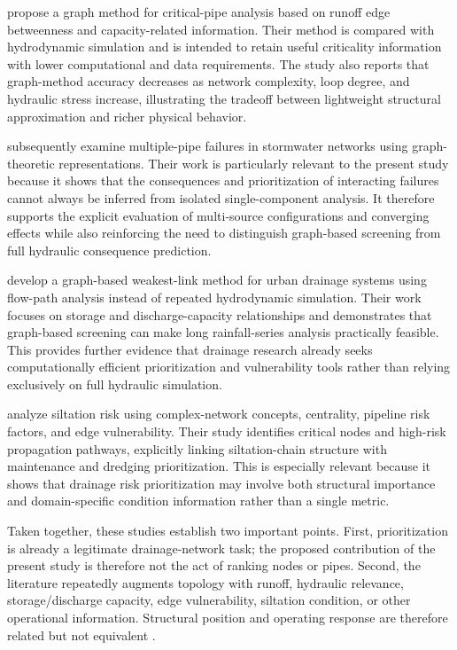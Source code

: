 \citet{dastgir2023} propose a graph method for critical-pipe
analysis based on runoff edge betweenness and capacity-related
information. Their method is compared with hydrodynamic simulation and
is intended to retain useful criticality information with lower
computational and data requirements. The study also reports that
graph-method accuracy decreases as network complexity, loop degree, and
hydraulic stress increase, illustrating the tradeoff between lightweight
structural approximation and richer physical behavior.

\citet{dastgir2024} subsequently examine multiple-pipe failures in
stormwater networks using graph-theoretic representations. Their work is
particularly relevant to the present study because it shows that the
consequences and prioritization of interacting failures cannot always be
inferred from isolated single-component analysis. It therefore supports
the explicit evaluation of multi-source configurations and converging
effects while also reinforcing the need to distinguish graph-based
screening from full hydraulic consequence prediction.

\citet{meijer2023} develop a graph-based weakest-link method for
urban drainage systems using flow-path analysis instead of repeated
hydrodynamic simulation. Their work focuses on storage and
discharge-capacity relationships and demonstrates that graph-based
screening can make long rainfall-series analysis practically feasible.
This provides further evidence that drainage research already seeks
computationally efficient prioritization and vulnerability tools rather
than relying exclusively on full hydraulic simulation.

\citet{zhang2025} analyze siltation risk using complex-network
concepts, centrality, pipeline risk factors, and edge vulnerability.
Their study identifies critical nodes and high-risk propagation
pathways, explicitly linking siltation-chain structure with maintenance
and dredging prioritization. This is especially relevant because it
shows that drainage risk prioritization may involve both structural
importance and domain-specific condition information rather than a
single metric.

Taken together, these studies establish two important points. First,
prioritization is already a legitimate drainage-network task; the
proposed contribution of the present study is therefore not the act of ranking nodes
or pipes. Second, the literature repeatedly augments topology with
runoff, hydraulic relevance, storage/discharge capacity, edge
vulnerability, siltation condition, or other operational information.
Structural position and operating response are therefore related but not
equivalent \citep{simone2022,simone2023,dastgir2023,meijer2023,zhang2025}.

